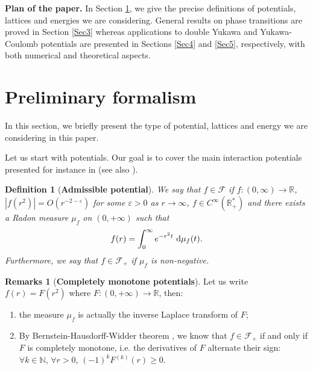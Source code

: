 \documentclass[12pt]{interact}
\newtheorem{defi}[thm]{Definition}
\theoremstyle{definition}
\newtheorem{remarks}[thm]{Remarks}
\newcommand{\R}{\mathbb R}
\newcommand{\N}{\mathbb N}
\begin{document}
\medskip

\textbf{Plan of the paper.}
In Section \ref{Sec2}, we give the precise definitions of potentials,
lattices and energies we are considering.
General results on phase transitions are proved in Section \ref{Sec3}
whereas applications to double Yukawa and Yukawa-Coulomb potentials are
presented in Sections \ref{Sec4} and \ref{Sec5}, respectively,
with both numerical and theoretical aspects.

\section{Preliminary formalism} \label{Sec2}
In this section, we briefly present the type of potential,
lattices and energy we are considering in this paper.

\medskip

Let us start with potentials. Our goal is to cover the main interaction potentials presented for instance in \cite{Kaplan} (see also \cite{Bet16}).
\begin{defi}[\textbf{Admissible potential}]
We say that $f\in \mathcal{F}$ if $f:(0,\infty)\to \R$, $|f(r^2)|=O(r^{-2-\varepsilon})$ for some $\varepsilon>0$ as $r\to \infty$, $f\in C^{\infty}(\R_+^*)$ and there exists a Radon measure $\mu_f$ on $(0,+\infty)$ such that
\begin{equation}\label{fgen}
f(r) = \int_0^\infty e^{-r^2 t}\ {\rm d}\mu_f(t).
\end{equation}
Furthermore, we say that $f\in \mathcal{F}_+$ if $\mu_f$ is non-negative.
\end{defi}
\begin{remarks}[\textbf{Completely monotone potentials}]
Let us write $f(r)=F(r^2)$ where $F:(0,+\infty)\to \R$, then:
\begin{enumerate}
\item the measure $\mu_f$ is actually the inverse Laplace transform of $F$;
\item By Bernstein-Hausdorff-Widder theorem \cite{Bernstein29}, we know that $f\in \mathcal{F}_+$ if and only if $F$ is completely monotone, i.e. the derivatives of $F$ alternate their sign: $\forall k\in \N$, $\forall r>0$, $(-1)^{k}F^{(k)}(r)\geq 0$.
\end{enumerate}
\end{remarks}
\end{document}
